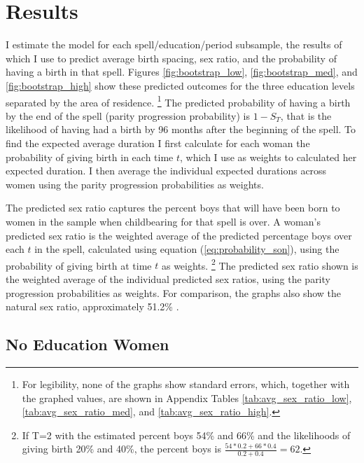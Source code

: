\documentclass[12pt,letterpaper]{article}
\begin{document}
\section{Results\label{sec:results}}


I estimate the model for each spell/education/period subsample, the results of which I use 
to predict average birth spacing, sex ratio, and the probability of having a birth in that 
spell.
Figures \ref{fig:bootstrap_low}, \ref{fig:bootstrap_med}, and  \ref{fig:bootstrap_high} 
show these predicted outcomes for the three education levels separated by the area of 
residence.%
\footnote{
For legibility, none of the graphs show standard errors, which, together with the graphed 
values, are shown in Appendix Tables 
\ref{tab:avg_sex_ratio_low}, 
\ref{tab:avg_sex_ratio_med}, and 
\ref{tab:avg_sex_ratio_high}.
}
The predicted probability of having a birth by the end of the spell (parity progression
probability) is $1-S_{T}$, that is the likelihood of having had a birth by 96 months after 
the beginning of the spell.
To find the expected average duration I first calculate for each woman the probability 
of giving birth in each time $t$, which I use as weights to calculated her expected duration. 
I then average the individual expected durations across women using the parity progression
probabilities as weights.

The predicted sex ratio captures the percent boys that will have been born to women 
in the sample when childbearing for that spell is over.
A woman's predicted sex ratio is the weighted average of the predicted percentage boys 
over each $t$ in the spell, calculated using equation (\ref{eq:probability_son}), using
the probability of giving birth at time $t$ as weights.%
\footnote{
If T=2 with the estimated percent boys 54\% and 66\% and the likelihoods of giving 
birth 20\% and 40\%, the percent boys is $\frac{54*0.2+66*0.4}{0.2+0.4} = 62$.
}
The predicted sex ratio shown is the weighted average of the individual predicted sex 
ratios, using the parity progression probabilities as weights.
For comparison, the graphs also show the natural sex ratio, approximately 51.2\% 
\citep{ben-porath76b,jacobsen99,Portner2015b}.


\subsection{No Education Women}

\end{document}
